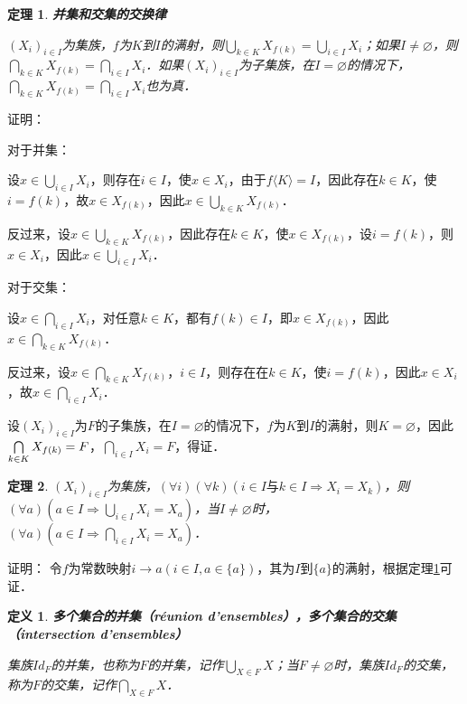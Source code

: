 \documentclass[12pt, a4paper, oneside]{book}
\newtheorem{theo}{定理}
\newtheorem{de}{定义}
\begin{document}
			\begin{theo}\label{theo23}
				\textbf{并集和交集的交换律}
				\par
				$(X_i)_{i\in I}$为集族，$f$为$K$到$I$的满射，则$\bigcup\limits_{k\in K}X_{f(k)}=\bigcup\limits_{i\in I}X_i$；如果$I\neq \varnothing$，则$\bigcap\limits_{k\in K}X_{f(k)}=\bigcap\limits_{i\in I}X_i$．如果$(X_i)_{i\in I}$为子集族，在$I=\varnothing$的情况下，$\bigcap\limits_{k\in K}X_{f(k)}=\bigcap\limits_{i\in I}X_i$也为真．
			\end{theo}
			证明：
			\par
			对于并集：
			\par
			设$x\in \bigcup\limits_{i\in I}X_i$，则存在$i\in I$，使$x\in X_i$，由于$f\langle K\rangle=I$，因此存在$k\in K$，使$i=f(k)$，故$x\in X_{f(k)}$，因此$x\in \bigcup\limits_{k\in K}X_{f(k)}$．
			\par
			反过来，设$x\in \bigcup\limits_{k\in K}X_{f(k)}$，因此存在$k\in K$，使$x\in X_{f(k)}$，设$i=f(k)$，则$x\in X_i$，因此$x\in \bigcup\limits_{i\in I}X_i$．
			\par
			对于交集：
			\par
			设$x\in \bigcap\limits_{i\in I}X_i$，对任意$k\in K$，都有$f(k)\in I$，即$x\in X_{f(k)}$，因此$x\in \bigcap\limits_{k\in K}X_{f(k)}$．
			\par
			反过来，设$x\in \bigcap\limits_{k\in K}X_{f(k)}$，$i\in I$，则存在在$k\in K$，使$i=f(k)$，因此$x\in X_i$，故$x\in \bigcap\limits_{i\in I}X_i$．
			\par
			设$(X_i)_{i\in I}$为$F$的子集族，在$I=\varnothing$的情况下，$f$为$K$到$I$的满射，则$K=\varnothing$，因此$\bigcap\limits_{k\in K}X_{f(k)}\\=F$，$\bigcap\limits_{i\in I}X_i=F$，得证．

			\begin{theo}\label{theo24}
				$(X_i)_{i\in I}$为集族，$(\forall i)(\forall k)(i\in I\text{与}k\in I\Rightarrow X_i=X_k)$，则$(\forall a)(a\in I\Rightarrow \bigcup\limits_{i\in I}X_i=X_a)$，当$I\neq \varnothing$时，$(\forall a)(a\in I\Rightarrow \bigcap\limits_{i\in I}X_i=X_a)$．
			\end{theo}
			证明：
			令$f$为常数映射$i\to a(i\in I, a\in \{a\})$，其为$I$到$\{a\}$的满射，根据定理\ref{theo23}可证．

			\begin{de}
				\textbf{多个集合的并集（réunion d'ensembles），多个集合的交集（intersection d'ensembles）}
				\hfill\par
				集族$Id_F$的并集，也称为$F$的并集，记作$\bigcup\limits_{X\in F}X$；当$F\neq \varnothing$时，集族$Id_F$的交集，称为$F$的交集，记作$\bigcap\limits_{X\in F}X$．
			\end{de}
\end{document}
